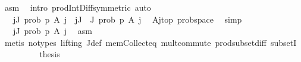 \begin{isabellebody}
\ asm{\isacharparenleft}{\kern0pt}{}{\isacharparenright}{\kern0pt}\ \isamarkupfalse%
\ {\isacharparenleft}{\kern0pt}intro\ prod{\isachardot}{\kern0pt}Int{\isacharunderscore}{\kern0pt}Diff{\isacharbrackleft}{\kern0pt}symmetric{\isacharbrackright}{\kern0pt}{\isacharparenright}{\kern0pt}\ auto\isanewline
\ \ \ \ \ \ \isamarkupfalse%
\ \isamarkupfalse%
\ {\isachardoublequoteopen}{\isachardot}{\kern0pt}{\isachardot}{\kern0pt}{\isachardot}{\kern0pt}\ {\isacharequal}{\kern0pt}\ {\isacharparenleft}{\kern0pt}{\isasymProd}j{\isasymin}J{\isacharprime}{\kern0pt}{\isachardot}{\kern0pt}\ prob\ p\ {\isacharparenleft}{\kern0pt}A\ j{\isacharparenright}{\kern0pt}{\isacharparenright}{\kern0pt}\ {\isacharasterisk}{\kern0pt}\ {\isacharparenleft}{\kern0pt}{\isasymProd}j{\isasymin}J\ {\isacharminus}{\kern0pt}\ J{\isacharprime}{\kern0pt}{\isachardot}{\kern0pt}\ prob\ p\ {\isacharparenleft}{\kern0pt}A\ j{\isacharparenright}{\kern0pt}{\isacharparenright}{\kern0pt}{\isachardoublequoteclose}\ \isamarkupfalse%
\ A{\isacharunderscore}{\kern0pt}j{\isacharunderscore}{\kern0pt}top\ prob{\isacharunderscore}{\kern0pt}space\ \isamarkupfalse%
\ simp\isanewline
\ \ \ \ \ \ \isamarkupfalse%
\ \isamarkupfalse%
\ {\isachardoublequoteopen}{\isachardot}{\kern0pt}{\isachardot}{\kern0pt}{\isachardot}{\kern0pt}\ {\isacharequal}{\kern0pt}\ {\isacharparenleft}{\kern0pt}{\isasymProd}j{\isasymin}J{\isachardot}{\kern0pt}\ prob\ p\ {\isacharparenleft}{\kern0pt}A\ j{\isacharparenright}{\kern0pt}{\isacharparenright}{\kern0pt}{\isachardoublequoteclose}\ \isamarkupfalse%
\ asm{\isacharparenleft}{\kern0pt}{}{\isacharparenright}{\kern0pt}\ \isamarkupfalse%
\ {\isacharparenleft}{\kern0pt}metis\ {\isacharparenleft}{\kern0pt}no{\isacharunderscore}{\kern0pt}types{\isacharcomma}{\kern0pt}\ lifting{\isacharparenright}{\kern0pt}\ J{\isacharprime}{\kern0pt}{\isacharunderscore}{\kern0pt}def\ mem{\isacharunderscore}{\kern0pt}Collect{\isacharunderscore}{\kern0pt}eq\ mult{\isachardot}{\kern0pt}commute\ prod{\isachardot}{\kern0pt}subset{\isacharunderscore}{\kern0pt}diff\ subsetI{\isacharparenright}{\kern0pt}\isanewline
\ \ \ \ \ \ \isamarkupfalse%
\ \isamarkupfalse%
\ {\isacharquery}{\kern0pt}thesis\ \isacommand{{\isachardot}{\kern0pt}}\isamarkupfalse%
\isanewline
\ \ \ \ \isamarkupfalse%
\isanewline
\ \ \isacommand{{\isacharbraceright}{\kern0pt}}\isamarkupfalse%
\isanewline
\ \ \isamarkupfalse%

\end{isabellebody}
